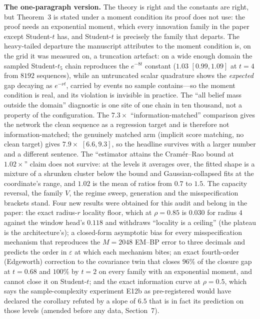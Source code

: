 \documentclass[11pt,a4paper]{article}
\newcommand{\hi}[1]{\textbf{#1}}
\theoremstyle{definition}
\theoremstyle{remark}
\begin{document}
\medskip
\noindent\hi{The one-paragraph version.} The theory is right and the constants are right, but Theorem~3 is stated under a moment condition its proof does not use: the proof needs an exponential moment, which every innovation family in the paper except Student-$t$ has, and Student-$t$ is precisely the family that departs. The heavy-tailed departure the manuscript attributes to the moment condition is, on the grid it was measured on, a truncation artefact: on a wide enough domain the sampled Student-$t_5$ chain reproduces the $e^{-8t}$ constant ($1.03$ $[0.99,1.09]$ at $t=4$ from $8192$ sequences), while an untruncated scalar quadrature shows the \emph{expected} gap decaying as $e^{-\nu t}$, carried by events no sample contains---so the moment condition is real, and its violation is invisible in practice. The ``all belief mass outside the domain'' diagnostic is one site of one chain in ten thousand, not a property of the configuration. The $7.3\times$ ``information-matched'' comparison gives the network the clean sequence as a regression target and is therefore not information-matched; the genuinely matched arm (implicit score matching, no clean target) gives $7.9\times$ $[6.6, 9.3]$, so the headline survives with a larger number and a different sentence. The ``estimator attains the Cram\'er--Rao bound at $1.02\times$'' claim does not survive: at the levels it averages over, the fitted shape is a mixture of a shrunken cluster below the bound and Gaussian-collapsed fits at the coordinate's range, and $1.02$ is the mean of ratios from $0.7$ to $1.5$. The capacity reversal, the family $V$, the regime sweep, generation and the misspecification brackets stand. Four new results were obtained for this audit and belong in the paper: the exact radius-$r$ locality floor, which at $\rho=0.85$ is $0.030$ for radius $4$ against the window head's $0.118$ and withdraws ``locality is a ceiling'' (the plateau is the architecture's); a closed-form asymptotic bias for every misspecification mechanism that reproduces the $M=2048$ EM--BP error to three decimals and predicts the order in $\varepsilon$ at which each mechanism bites; an exact fourth-order (Edgeworth) correction to the covariance twin that closes $96\%$ of the closure gap at $t=0.68$ and $100\%$ by $t=2$ on every family with an exponential moment, and cannot close it on Student-$t$; and the exact information curve at $\rho=0.5$, which says the sample-complexity experiment E12b as pre-registered would have declared the corollary refuted by a slope of $6.5$ that is in fact its prediction on those levels (amended before any data, Section~7).
\end{document}
